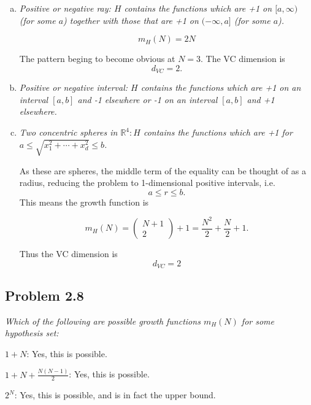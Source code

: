 \documentclass{article}
\begin{document}
\begin{enumerate}[(a)]
  \item \textit{Positive or negative ray: $H$ contains the functions which are +1 on $[a, \infty)$
    (for some $a$) together with those that are +1 on $(-\infty, a]$ (for some $a$).}

    $$m_H(N) = 2N$$

    The pattern beging to become obvious at $N = 3$. The VC dimension is $$d_{VC} = 2.$$

  \item \textit{Positive or negative interval: $H$ contains the functions which are +1 on an
    interval $[a,b]$ and -1 elsewhere or -1 on an interval $[a,b]$ and +1 elsewhere.}

      

  \item \textit{Two concentric spheres in $\mathbb{R}^4: H$ contains the functions which are +1
    for $a \leq \sqrt{x_1^2 + \cdots + x_d^2} \leq b$.}

    As these are spheres, the middle term of the equality can be thought of as a radius, reducing
    the problem to 1-dimensional positive intervals, i.e. $$a \leq r \leq b.$$ This means the growth
    function is

    $$m_H(N) = \begin{pmatrix} N+1 \\ 2 \end{pmatrix} + 1 = \frac{N^2}{2} + \frac{N}{2} + 1.$$

    Thus the VC dimension is $$d_{VC} = 2$$

\end{enumerate}



\subsection*{Problem 2.8}

\textit{Which of the following are possible growth functions $m_H(N)$ for some hypothesis set:}

\smallskip

$1+N$: Yes, this is possible.

\smallskip

$1+N+\frac{N(N-1)}{2}$: Yes, this is possible.

\smallskip

$2^N$: Yes, this is possible, and is in fact the upper bound.

\smallskip
\end{document}
